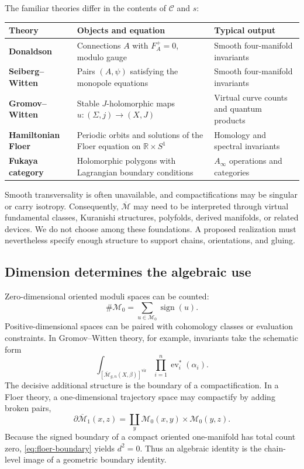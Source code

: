 \documentclass[11pt,letterpaper,twoside]{article}
\theoremstyle{plain}
\theoremstyle{definition}
\theoremstyle{remark}
\newcommand{\M}{\mathcal{M}}
\newcommand{\overM}{\overline{\mathcal{M}}}
\newcommand{\R}{\mathbb{R}}
\newcommand{\vir}{\mathrm{vir}}
\newcommand{\Ainf}{A_\infty}
\begin{document}
The familiar theories differ in the contents of \(\mathcal C\) and \(s\):
\begin{center}
\small
\begin{tabularx}{\textwidth}{@{}>{\bfseries}p{}X X@{}}
\toprule
Theory & Objects and equation & Typical output \\
\midrule
Donaldson & Connections \(A\) with \(F_A^+=0\), modulo gauge & Smooth four-manifold invariants \\
Seiberg--Witten & Pairs \((A,\psi)\) satisfying the monopole equations & Smooth four-manifold invariants \\
Gromov--Witten & Stable \(J\)-holomorphic maps \(u:(\Sigma,j)\to(X,J)\) & Virtual curve counts and quantum products \\
Hamiltonian Floer & Periodic orbits and solutions of the Floer equation on \(\R\times S^1\) & Homology and spectral invariants \\
Fukaya category & Holomorphic polygons with Lagrangian boundary conditions & \(\Ainf\) operations and categories \\
\bottomrule
\end{tabularx}
\end{center}

Smooth transversality is often unavailable, and compactifications may be singular or carry isotropy.  Consequently, \(\overM\) may need to be interpreted through virtual fundamental classes, Kuranishi structures, polyfolds, derived manifolds, or related devices.  We do not choose among these foundations.  A proposed realization must nevertheless specify enough structure to support chains, orientations, and gluing.

\subsection{Dimension determines the algebraic use}

Zero-dimensional oriented moduli spaces can be counted:
\[
  \#\M_0=\sum_{u\in\M_0}\operatorname{sign}(u).
\]
Positive-dimensional spaces can be paired with cohomology classes or evaluation constraints.  In Gromov--Witten theory, for example, invariants take the schematic form
\[
  \int_{[\overM_{g,n}(X,\beta)]^{\vir}}
  \prod_{i=1}^{n}\operatorname{ev}_i^*(\alpha_i).
\]
The decisive additional structure is the boundary of a compactification.  In a Floer theory, a one-dimensional trajectory space may compactify by adding broken pairs,
\begin{equation}\label{eq:floer-boundary}
 \partial\overM_1(x,z)
 =\coprod_y \M_0(x,y)\times\M_0(y,z).
\end{equation}
Because the signed boundary of a compact oriented one-manifold has total count zero, \eqref{eq:floer-boundary} yields \(d^2=0\).  Thus an algebraic identity is the chain-level image of a geometric boundary identity.
\end{document}
